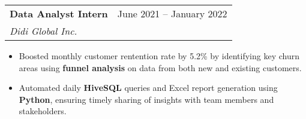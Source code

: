 \documentclass[letterpaper,11pt]{article}
\makeatletter
\newcommand{\resumeItem}[1]{
  \item\small{
    {#1 \vspace{-2pt}}
  }
}
\newcommand{\resumeSubheading}[4]{
  \vspace{-2pt}\item
    \begin{tabular*}{0.97\textwidth}[t]{l@{\extracolsep{\fill}}r}
      \textbf{#1} & #2 \\
      \textit{\small#3} & \textit{\small #4} \\
    \end{tabular*}\vspace{-7pt}
}
\newcommand{\resumeSubSubheading}[2]{
    \item
    \begin{tabular*}{0.97\textwidth}{l@{\extracolsep{\fill}}r}
      \textit{\small#1} & \textit{\small #2} \\
    \end{tabular*}\vspace{-7pt}
}
\newcommand{\resumeSubHeadingListEnd}{\end{itemize}}
\newcommand{\resumeItemListStart}{\begin{itemize}}
\newcommand{\resumeItemListEnd}{\end{itemize}\vspace{-5pt}}
\makeatother
\begin{document}
    \resumeSubheading
      {Data Analyst Intern}{June 2021 -- January 2022}
      {Didi Global Inc.}{}
      \resumeItemListStart

        \resumeItem{Boosted monthly customer rentention rate by 5.2\% by identifying key churn areas using \textbf{funnel analysis} on data from both new and existing customers.}
        \resumeItem{Automated daily \textbf{HiveSQL} queries and Excel report generation using \textbf{Python}, ensuring timely sharing of insights with team members and stakeholders.}
      \resumeItemListEnd
      

\end{document}
